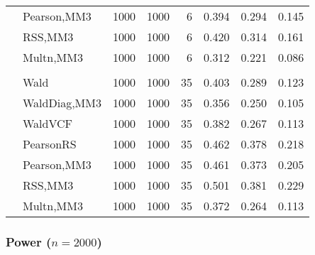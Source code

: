 \documentclass[
]{article}
\begin{document}
\begin{table}[H]
{\begin{tabular}[t]{llrrrrrr}
\hspace{1em} & Pearson,MM3 & 1000 & 1000 & 6 & 0.394 & 0.294 & 0.145\\

\hspace{1em} & RSS,MM3 & 1000 & 1000 & 6 & 0.420 & 0.314 & 0.161\\

\hspace{1em} & Multn,MM3 & 1000 & 1000 & 6 & 0.312 & 0.221 & 0.086\\
\cmidrule{1-8}
\addlinespace[0.3em]
\multicolumn{8}{l}{\textbf{3F 15V}}\\
\hspace{1em} & Wald & 1000 & 1000 & 35 & 0.403 & 0.289 & 0.123\\

\hspace{1em} & WaldDiag,MM3 & 1000 & 1000 & 35 & 0.356 & 0.250 & 0.105\\

\hspace{1em} & WaldVCF & 1000 & 1000 & 35 & 0.382 & 0.267 & 0.113\\

\hspace{1em} & PearsonRS & 1000 & 1000 & 35 & 0.462 & 0.378 & 0.218\\

\hspace{1em} & Pearson,MM3 & 1000 & 1000 & 35 & 0.461 & 0.373 & 0.205\\

\hspace{1em} & RSS,MM3 & 1000 & 1000 & 35 & 0.501 & 0.381 & 0.229\\

\hspace{1em} & Multn,MM3 & 1000 & 1000 & 35 & 0.372 & 0.264 & 0.113\\
\bottomrule
\end{tabular}}
\end{table}

\hypertarget{power-n2000}{%
\subsubsection{\texorpdfstring{Power
(\(n=2000\))}{Power (n=2000)}}\label{power-n2000}}
\end{document}
